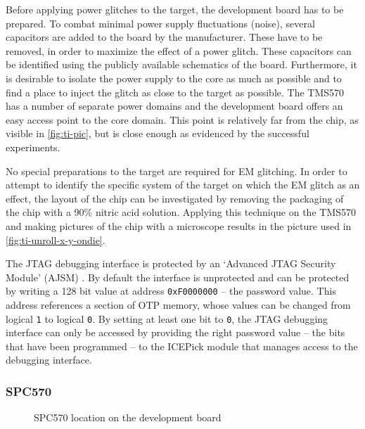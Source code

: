 \documentclass[10pt]{article}
\newcommand{\TI}{TMS570\xspace}
\newcommand{\ST}{SPC570\xspace}
\begin{document}
      Before applying power glitches to the target, the development board has to be prepared. To combat minimal power supply fluctuations (noise), several capacitors are added to the board by the manufacturer. These have to be removed, in order to maximize the effect of a power glitch. These capacitors can be identified using the publicly available schematics \cite{texas_instruments_schematic} of the board. 
      Furthermore, it is desirable to isolate the power supply to the core as much as possible and to find a place to inject the glitch as close to the target as possible. The \TI has a number of separate power domains and the development board offers an easy access point to the core domain. This point is relatively far from the chip, as visible in \autoref{fig:ti-pic}, but is close enough as evidenced by the successful experiments.

      No special preparations to the target are required for EM glitching. In order to attempt to identify the specific system of the target on which the EM glitch as an effect, the layout of the chip can be investigated by removing the packaging of the chip with a 90\% nitric acid solution. %
      Applying this technique on the \TI and making pictures of the chip with a microscope results in the picture used in \autoref{fig:ti-unroll-x-y-ondie}.

      The JTAG debugging interface is protected by an `Advanced JTAG Security Module' (AJSM) \cite{texas_instruments_datasheet_2015}. By default the interface is unprotected and can be protected by writing a 128 bit value at address \texttt{0xF0000000} -- the password value. This address references a section of OTP memory, whose values can be changed from logical \texttt{1} to logical \texttt{0}. By setting at least one bit to \texttt{0}, the JTAG debugging interface can only be accessed by providing the right password value -- the bits that have been programmed -- to the ICEPick module that manages access to the debugging interface.
      
    \subsubsection{\ST }
    \label{sec:target-st}

      \begin{figure}[H]
        \centering
        \def\svgwidth{\columnwidth}
        
        \caption{SPC570 location on the development board}
        \label{fig:fidiagram}
      \end{figure}
\end{document}
